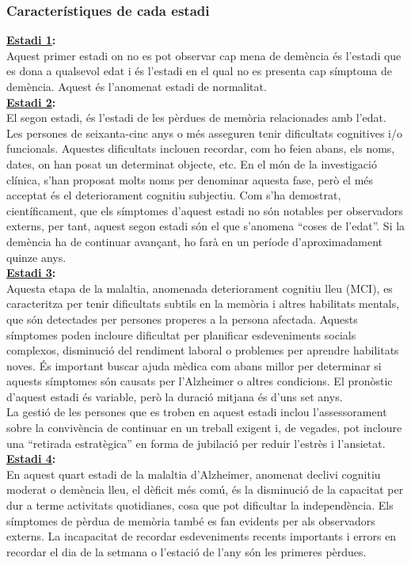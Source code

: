 \documentclass[a4paper,12pt]{article}
\begin{document}
\subsubsection*{Característiques de cada estadi}
\textbf{\underline{Estadi 1}:}\\
Aquest primer estadi on no es pot observar cap mena de demència és l'estadi que es dona a qualsevol edat i és l'estadi en el qual no es presenta cap símptoma de demència. Aquest és l'anomenat estadi de normalitat.\\
\textbf{\underline{Estadi 2}:}\\
El segon estadi, és l'estadi de les pèrdues de memòria relacionades amb l'edat. Les persones de seixanta-cinc anys o més asseguren tenir dificultats cognitives i/o funcionals. Aquestes dificultats inclouen recordar, com ho feien abans, els noms, dates, on han posat un determinat objecte, etc. En el món de la investigació clínica, s'han proposat molts noms per denominar aquesta fase, però el més acceptat és el deteriorament cognitiu subjectiu. Com s'ha demostrat, científicament, que els símptomes d'aquest estadi no són notables per observadors externs, per tant, aquest segon estadi són el que s'anomena “coses de l'edat”. Si la demència ha de continuar avançant, ho farà en un període d'aproximadament quinze anys.\\
\textbf{\underline{Estadi 3}:}\\
Aquesta etapa de la malaltia, anomenada deteriorament cognitiu lleu (MCI), es caracteritza per tenir dificultats subtils en la memòria i altres habilitats mentals, que són detectades per persones properes a la persona afectada. Aquests símptomes poden incloure dificultat per planificar esdeveniments socials complexos, disminució del rendiment laboral o problemes per aprendre habilitats noves. És important buscar ajuda mèdica com abans millor per determinar si aquests símptomes són causats per l'Alzheimer o altres condicions. El pronòstic d'aquest estadi és variable, però la duració mitjana és d'uns set anys.\\
La gestió de les persones que es troben en aquest estadi inclou l'assessorament sobre la convivència de continuar en un treball exigent i, de vegades, pot incloure una “retirada estratègica” en forma de jubilació per reduir l'estrès i l'ansietat.\\
\textbf{\underline{Estadi 4}:}\\
En aquest quart estadi de la malaltia d'Alzheimer, anomenat declivi cognitiu moderat o demència lleu, el dèficit més comú, és la disminució de la capacitat per dur a terme activitats quotidianes, cosa que pot dificultar la independència. Els símptomes de pèrdua de memòria també es fan evidents per als observadors externs. La incapacitat de recordar esdeveniments recents importants i errors en recordar el dia de la setmana o l'estació de l'any són les primeres pèrdues.\\
\end{document}

